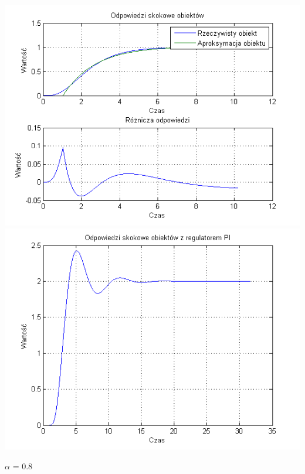 \documentclass[10pt,a4paper]{article}
\begin{document}
\begin{center}
\includegraphics[scale=1]{images/jeden/skrypt_129.png}\\
\includegraphics[scale=1]{images/jeden/skrypt_130.png}\\
\end{center}
\newpage
$\alpha$ = 0.8
\end{document}
